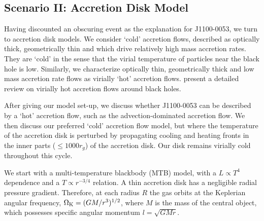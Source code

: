\documentclass[a4paper,fleqn,usenatbib]{mnras}
\begin{document}
\subsection{Scenario II: Accretion Disk Model}
Having discounted an obscuring event as the explanation for
J1100-0053, we turn to accretion disk models. We consider `cold'
accretion flows, described as optically thick, geometrically thin and
which drive relatively high mass accretion rates. They are `cold' in
the sense that the virial temperature of particles near the black hole
is low. Similarly, we characterize optically thin, geometrically thick
and low mass accretion rate flows as virially `hot' accretion
flows. \citet{YuanNarayan2014} present a detailed review on virially
hot accretion flows around black holes.

After giving our model set-up, we discuss whether J1100-0053 can be
described by a `hot' accretion flow, such as the advection-dominated
accretion flow. We then discuss our preferred `cold' accretion flow
model, but where the temperature of the accretion disk is perturbed by
propagating cooling and heating fronts in the inner parts ($\leq 1000
r_{g}$) of the accretion disk. Our disk remains virially cold
throughout this cycle.
 
We start with a multi-temperature blackbody (MTB) model, with a $L
\propto T^4$ dependence and a $T \propto r^{-3/4}$ relation. A thin
accretion disk has a negligible radial pressure gradient. Therefore,
at each radius $R$ the gas orbits at the Keplerian angular frequency,
$\Omega_{\rm K} = (GM/r^{3})^{1/2}$, where $M$ is the mass of the
central object, which possesses specific angular momentum $l=
\sqrt{GMr}$.
\end{document}
